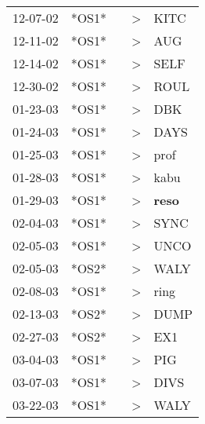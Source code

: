 \begin{supertabular}{p{0.07\textwidth}p{0.06\textwidth}p{0.02\textwidth}p{0.02\textwidth}p{0.06\textwidth}}
          12-07-02\textsuperscript{} &  *OS1* &   &     \textgreater &           KITC\textsuperscript{} \\
          12-11-02\textsuperscript{} &  *OS1* &   &     \textgreater &            AUG\textsuperscript{} \\
          12-14-02\textsuperscript{} &  *OS1* &   &     \textgreater &           SELF\textsuperscript{} \\
          12-30-02\textsuperscript{} &  *OS1* &   &     \textgreater &           ROUL\textsuperscript{} \\
          01-23-03\textsuperscript{} &  *OS1* &   &     \textgreater &            DBK\textsuperscript{} \\
          01-24-03\textsuperscript{} &  *OS1* &   &     \textgreater &           DAYS\textsuperscript{} \\
          01-25-03\textsuperscript{} &  *OS1* &   &     \textgreater &           prof\textsuperscript{} \\
          01-28-03\textsuperscript{} &  *OS1* &   &     \textgreater &           kabu\textsuperscript{} \\
          01-29-03\textsuperscript{} &  *OS1* &   &     \textgreater &  \textbf{reso\textsuperscript{}} \\
          02-04-03\textsuperscript{} &  *OS1* &   &     \textgreater &           SYNC\textsuperscript{} \\
          02-05-03\textsuperscript{} &  *OS1* &   &     \textgreater &           UNCO\textsuperscript{} \\
          02-05-03\textsuperscript{} &  *OS2* &   &     \textgreater &           WALY\textsuperscript{} \\
          02-08-03\textsuperscript{} &  *OS1* &   &     \textgreater &           ring\textsuperscript{} \\
          02-13-03\textsuperscript{} &  *OS2* &   &     \textgreater &           DUMP\textsuperscript{} \\
          02-27-03\textsuperscript{} &  *OS2* &   &     \textgreater &            EX1\textsuperscript{} \\
          03-04-03\textsuperscript{} &  *OS1* &   &     \textgreater &            PIG\textsuperscript{} \\
          03-07-03\textsuperscript{} &  *OS1* &   &     \textgreater &           DIVS\textsuperscript{} \\
          03-22-03\textsuperscript{} &  *OS1* &   &     \textgreater &           WALY\textsuperscript{} \\

\end{supertabular}
